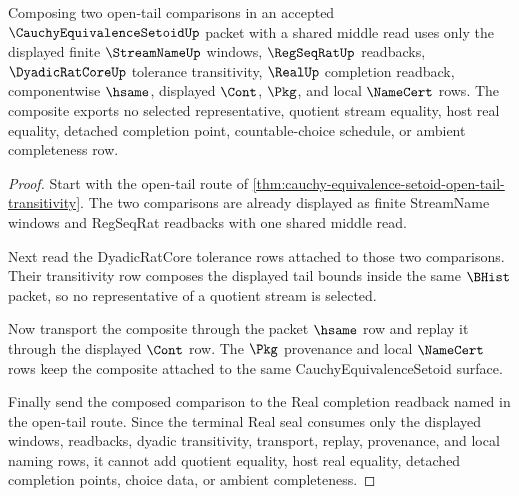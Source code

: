 \begin{theorem}
\label{thm:cauchy-equivalence-setoid-tail-transitivity-choice-free}
Composing two open-tail comparisons in an accepted
$\CauchyEquivalenceSetoidUp$ packet with a shared middle read uses only the
displayed finite $\StreamNameUp$ windows, $\RegSeqRatUp$ readbacks,
$\DyadicRatCoreUp$ tolerance transitivity, $\RealUp$ completion readback,
componentwise $\hsame$, displayed $\Cont$, $\Pkg$, and local $\NameCert$ rows.
The composite exports no selected representative, quotient stream equality,
host real equality, detached completion point, countable-choice schedule, or
ambient completeness row.
\end{theorem}
\begin{proof}
Start with the open-tail route of
\autoref{thm:cauchy-equivalence-setoid-open-tail-transitivity}. The two
comparisons are already displayed as finite StreamName windows and RegSeqRat
readbacks with one shared middle read.

Next read the DyadicRatCore tolerance rows attached to those two comparisons.
Their transitivity row composes the displayed tail bounds inside the same
$\BHist$ packet, so no representative of a quotient stream is selected.

Now transport the composite through the packet $\hsame$ row and replay it
through the displayed $\Cont$ row. The $\Pkg$ provenance and local $\NameCert$
rows keep the composite attached to the same CauchyEquivalenceSetoid surface.

Finally send the composed comparison to the Real completion readback named in
the open-tail route. Since the terminal Real seal consumes only the displayed
windows, readbacks, dyadic transitivity, transport, replay, provenance, and
local naming rows, it cannot add quotient equality, host real equality,
detached completion points, choice data, or ambient completeness.
\end{proof}
